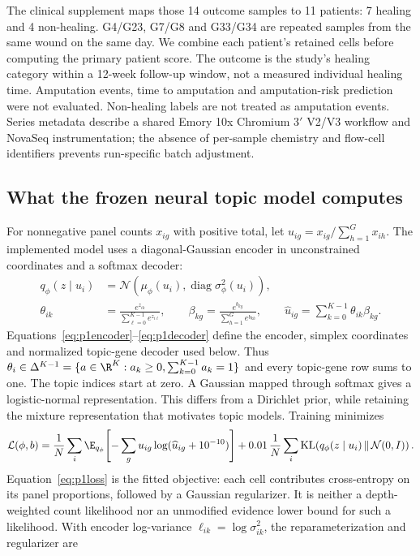 \documentclass[10pt,a4paper]{article}
\begin{document}
The clinical supplement maps those 14 outcome samples to 11 patients: 7 healing and 4 non-healing. G4/G23, G7/G8 and G33/G34 are repeated samples from the same wound on the same day. We combine each patient's retained cells before computing the primary patient score. The outcome is the study's healing category within a 12-week follow-up window, not a measured individual healing time. Amputation events, time to amputation and amputation-risk prediction were not evaluated. Non-healing labels are not treated as amputation events. Series metadata describe a shared Emory 10x Chromium 3$'$ V2/V3 workflow and NovaSeq instrumentation; the absence of per-sample chemistry and flow-cell identifiers prevents run-specific batch adjustment.

\subsection{What the frozen neural topic model computes}
For nonnegative panel counts $x_{ig}$ with positive total, let $u_{ig}=x_{ig}/\sum_{h=1}^{G}x_{ih}$. The implemented model uses a diagonal-Gaussian encoder in unconstrained coordinates and a softmax decoder:
\begin{align}
q_\phi(z\mid u_i)&=\mathcal N\!\left(\mu_\phi(u_i),\operatorname{diag}\sigma_\phi^2(u_i)\right),\label{eq:p1encoder}\\
\theta_{ik}&=\frac{e^{z_{ik}}}{\sum_{\ell=0}^{K-1}e^{z_{i\ell}}},\qquad
\beta_{kg}=\frac{e^{b_{kg}}}{\sum_{h=1}^{G}e^{b_{kh}}},\qquad
\widehat u_{ig}=\sum_{k=0}^{K-1}\theta_{ik}\beta_{kg}.\label{eq:p1decoder}
\end{align}
Equations~\eqref{eq:p1encoder}--\eqref{eq:p1decoder} define the encoder, simplex coordinates and normalized topic-gene decoder used below. Thus $\theta_i\in\Delta^{K-1}=\{a\in\R^K:a_k\geq0,\sum_{k=0}^{K-1}a_k=1\}$ and every topic-gene row sums to one. The topic indices start at zero. A Gaussian mapped through softmax gives a logistic-normal representation. This differs from a Dirichlet prior, while retaining the mixture representation that motivates topic models. Training minimizes
\begin{equation}
\mathcal L(\phi,b)=\frac1N\sum_i\E_{q_\phi}\!\left[-\sum_g u_{ig}\log(\widehat u_{ig}+10^{-10})\right]
+0.01\,\frac1N\sum_i\operatorname{KL}\!\left(q_\phi(z\mid u_i)\,\|\,\mathcal N(0,I)\right).\label{eq:p1loss}
\end{equation}
Equation~\eqref{eq:p1loss} is the fitted objective: each cell contributes cross-entropy on its panel proportions, followed by a Gaussian regularizer. It is neither a depth-weighted count likelihood nor an unmodified evidence lower bound for such a likelihood. With encoder log-variance $\ell_{ik}=\log\sigma_{ik}^2$, the reparameterization and regularizer are
\end{document}
